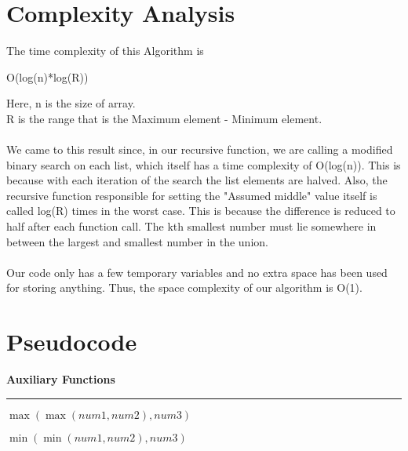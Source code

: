 \documentclass{article}
\begin{document}
\section{Complexity Analysis}
The time complexity of this Algorithm is
\begin{center}
O(log(n)*log(R))
\end{center}
Here, n is the size of array.\\
R is the range that is the Maximum element - Minimum element.
\\\\We came to this result since, in our recursive function, we are calling a modified binary search on each list, which itself has a time complexity of O(log(n)). This is because with each iteration of the search the list elements are halved. Also, the recursive function responsible for setting the "Assumed middle" value itself is called log(R) times in the worst case. This is because the difference is reduced to half after each function call. The kth smallest number must lie somewhere in between the largest and smallest number in the union.
\\\\
Our code only has a few temporary variables and no extra space has been used for storing anything. Thus, the space complexity of our algorithm is O(1).

\section{Pseudocode}

\begin{algorithm}
\textbf{Auxiliary Functions}
\hrule
\begin{algorithmic}[1]
    \State \Return $\max(\max(num1, num2), num3)$
\EndFunction

    \State \Return $\min(\min(num1, num2), num3)$
\EndFunction
\end{algorithmic}
\end{algorithm}
\end{document}
